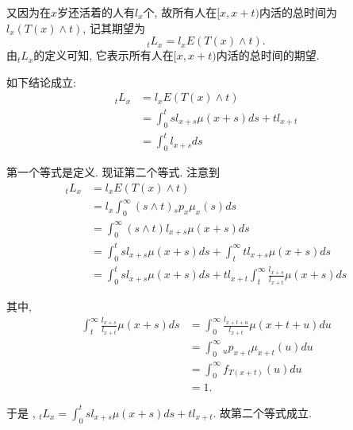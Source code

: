 \documentclass[a4paper,openany, 10pt]{ctexbook}
\begin{document}
又因为在$x$岁还活着的人有$l_x$个, 故所有人在$[x,x+t)$内活的总时间为$l_x(T(x)\wedge t)$, 记其期望为$$ {}_tL_x=l_xE(T(x)\wedge t).$$
由${}_tL_x$的定义可知, 它表示所有人在$[x,x+t)$内活的总时间的期望.
\begin{proposition} 如下结论成立:
    \begin{align*}
        {}_tL_x & =l_xE(T(x)\wedge t)                 \\
                & =\int_0^t sl_{x+s}\mu(x+s)ds+tl_{x+t} \\
                & =\int_0^tl_{x+s}ds
    \end{align*}
\end{proposition}
\proof 第一个等式是定义. 现证第二个等式. 注意到
\begin{align*}
    {}_tL_x & =l_xE(T(x)\wedge t)                                                                  \\
            & =l_x\int_0^{\infty} (s\wedge t){}_sp_x\mu_x(s)ds                                     \\
            & =\int_0^{\infty}(s\wedge t)l_{x+s}\mu(x+s)ds                                         \\
            & =\int_0^tsl_{x+s}\mu(x+s)ds+\int_t^{\infty}tl_{x+s}\mu(x+s)ds                        \\
            & =\int_0^tsl_{x+s}\mu(x+s)ds+tl_{x+t}\int_t^{\infty}\frac{l_{x+s}}{l_{x+t}}\mu(x+s)ds
\end{align*}

其中,\begin{align*}
    \int_t^{\infty}\frac{l_{x+s}}{l_{x+t}}\mu(x+s)ds
     & =\int_0^{\infty}\frac{l_{x+t+u}}{l_{x+t}}\mu(x+t+u)du \\
     & =\int_0^{\infty}{}_up_{x+t}\mu_{x+t}(u)du             \\
     & =\int_0^{\infty}f_{T{(x+t)}}(u)du                     \\
     & =1.
\end{align*}

于是 , ${}_tL_x=\int_0^tsl_{x+s}\mu(x+s)ds+tl_{x+t}.$ 故第二个等式成立.
\end{document}
